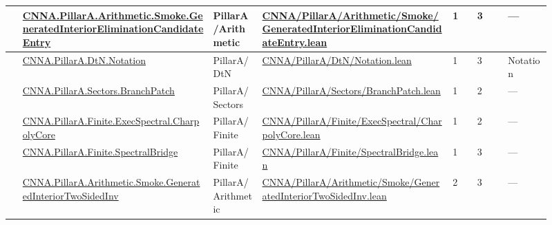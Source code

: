 \begin{longtable}{L{0.025\linewidth} L{0.315\linewidth} L{0.08\linewidth} L{0.315\linewidth} L{0.045\linewidth} L{0.055\linewidth} L{0.07\linewidth}}
\hline
{} & \href{run:repo_snapshot/CNNA/PillarA/Arithmetic/Smoke/GeneratedInteriorEliminationCandidateEntry.lean}{CNNA.\allowbreak{}PillarA.\allowbreak{}Arithmetic.\allowbreak{}Smoke.\allowbreak{}GeneratedInteriorEliminationCandidateEntry} & PillarA/\allowbreak{}Arithmetic & \href{run:repo_snapshot/CNNA/PillarA/Arithmetic/Smoke/GeneratedInteriorEliminationCandidateEntry.lean}{CNNA/\allowbreak{}PillarA/\allowbreak{}Arithmetic/\allowbreak{}Smoke/\allowbreak{}GeneratedInteriorEliminationCandidateEntry.\allowbreak{}lean} & 1 & 3 & ---\\
\hline
{} & \href{run:repo_snapshot/CNNA/PillarA/DtN/Notation.lean}{CNNA.\allowbreak{}PillarA.\allowbreak{}DtN.\allowbreak{}Notation} & PillarA/\allowbreak{}DtN & \href{run:repo_snapshot/CNNA/PillarA/DtN/Notation.lean}{CNNA/\allowbreak{}PillarA/\allowbreak{}DtN/\allowbreak{}Notation.\allowbreak{}lean} & 1 & 3 & Notation\\
\hline
{} & \href{run:repo_snapshot/CNNA/PillarA/Sectors/BranchPatch.lean}{CNNA.\allowbreak{}PillarA.\allowbreak{}Sectors.\allowbreak{}BranchPatch} & PillarA/\allowbreak{}Sectors & \href{run:repo_snapshot/CNNA/PillarA/Sectors/BranchPatch.lean}{CNNA/\allowbreak{}PillarA/\allowbreak{}Sectors/\allowbreak{}BranchPatch.\allowbreak{}lean} & 1 & 2 & ---\\
\hline
{} & \href{run:repo_snapshot/CNNA/PillarA/Finite/ExecSpectral/CharpolyCore.lean}{CNNA.\allowbreak{}PillarA.\allowbreak{}Finite.\allowbreak{}ExecSpectral.\allowbreak{}CharpolyCore} & PillarA/\allowbreak{}Finite & \href{run:repo_snapshot/CNNA/PillarA/Finite/ExecSpectral/CharpolyCore.lean}{CNNA/\allowbreak{}PillarA/\allowbreak{}Finite/\allowbreak{}ExecSpectral/\allowbreak{}CharpolyCore.\allowbreak{}lean} & 1 & 2 & ---\\
\hline
{} & \href{run:repo_snapshot/CNNA/PillarA/Finite/SpectralBridge.lean}{CNNA.\allowbreak{}PillarA.\allowbreak{}Finite.\allowbreak{}SpectralBridge} & PillarA/\allowbreak{}Finite & \href{run:repo_snapshot/CNNA/PillarA/Finite/SpectralBridge.lean}{CNNA/\allowbreak{}PillarA/\allowbreak{}Finite/\allowbreak{}SpectralBridge.\allowbreak{}lean} & 1 & 3 & ---\\
\hline
{} & \href{run:repo_snapshot/CNNA/PillarA/Arithmetic/Smoke/GeneratedInteriorTwoSidedInv.lean}{CNNA.\allowbreak{}PillarA.\allowbreak{}Arithmetic.\allowbreak{}Smoke.\allowbreak{}GeneratedInteriorTwoSidedInv} & PillarA/\allowbreak{}Arithmetic & \href{run:repo_snapshot/CNNA/PillarA/Arithmetic/Smoke/GeneratedInteriorTwoSidedInv.lean}{CNNA/\allowbreak{}PillarA/\allowbreak{}Arithmetic/\allowbreak{}Smoke/\allowbreak{}GeneratedInteriorTwoSidedInv.\allowbreak{}lean} & 2 & 3 & ---\\

\end{longtable}

